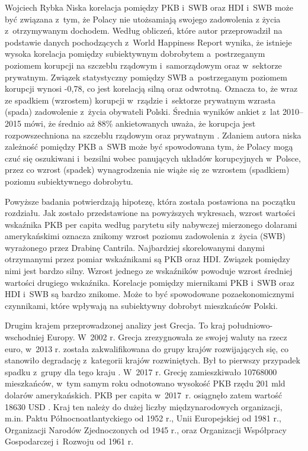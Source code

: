 \begin{artplenv}{Wojciech Rybka}
Niska korelacja pomiędzy PKB i~SWB oraz HDI i~SWB może być związana z~tym, że Polacy nie utożsamiają swojego zadowolenia
z życia z~otrzymywanym dochodem. Według obliczeń, które autor przeprowadził na podstawie danych pochodzących z~World
Happiness Report wynika, że istnieje wysoka korelacja pomiędzy subiektywnym dobrobytem a~postrzeganym poziomem korupcji
na szczeblu rządowym i~samorządowym oraz w~sektorze prywatnym. Związek statystyczny pomiędzy SWB a~postrzeganym
poziomem korupcji wynosi -0,78, co jest korelacją silną oraz odwrotną. Oznacza to, że wraz ze spadkiem (wzrostem)
korupcji w~rządzie i~sektorze prywatnym wzrasta (spada) zadowolenie z~życia obywateli Polski. Średnia wyników
ankiet z~lat 2010--2015 mówi, że średnio aż 88\% ankietowanych uważa, że korupcja jest rozpowszechniona na szczeblu rządowym oraz
prywatnym
\parencite{noauthor_world_2018}.
Zdaniem autora niska zależność pomiędzy PKB a~SWB
może być spowodowana tym, że Polacy mogą czuć się oszukiwani i~bezsilni wobec panujących układów korupcyjnych w~Polsce,
przez co wzrost (spadek) wynagrodzenia nie wiąże się ze wzrostem (spadkiem) poziomu subiektywnego dobrobytu.

Powyższe badania potwierdzają hipotezę, która została postawiona na początku rozdziału. Jak zostało przedstawione na
powyższych wykresach, wzrost wartości wskaźnika PKB per capita według parytetu siły nabywczej mierzonego dolarami
amerykańskimi oznacza znikomy wzrost poziomu zadowolenia z~życia (SWB) wyrażonego przez Drabinę Cantrila. Najbardziej
skorelowanymi danymi otrzymanymi przez pomiar wskaźnikami są PKB oraz HDI. Związek pomiędzy nimi jest bardzo silny.
Wzrost jednego ze wskaźników powoduje wzrost średniej wartości drugiego wskaźnika. Korelacje pomiędzy miernikami
PKB i~SWB oraz HDI i~SWB są bardzo znikome. Może to być spowodowane pozaekonomicznymi czynnikami, które wpływają na
subiektywny dobrobyt mieszkańców Polski.

Drugim krajem przeprowadzonej analizy jest Grecja. To kraj południowo-wschodniej Europy. W~2002 r. Grecja
zrezygnowała ze swojej waluty na rzecz euro, w~2013 r. została zakwalifikowana do grupy krajów rozwijających się, co
stanowiło degradację z~kategorii krajów rozwiniętych. Był to pierwszy przypadek spadku z~grupy dla tego kraju
\parencite{international_monetary_fund_world_2019a}.
W~2017 r. Grecję zamieszkiwało 10768000 mieszkańców,
w~tym samym roku odnotowano wysokość PKB rzędu 201 mld dolarów amerykańskich. PKB per capita w~2017~r. osiągnęło zatem
wartość 18630 USD
\parencite{international_monetary_fund_world_2019b}.
Kraj ten należy do dużej liczby
międzynarodowych organizacji, m.in. Paktu Północnoatlantyckiego od 1952 r., Unii Europejskiej od 1981 r., Organizacji
Narodów Zjednoczonych od 1945 r., oraz Organizacji Współpracy Gospodarczej i~Rozwoju od 1961 r. 


\end{artplenv}

